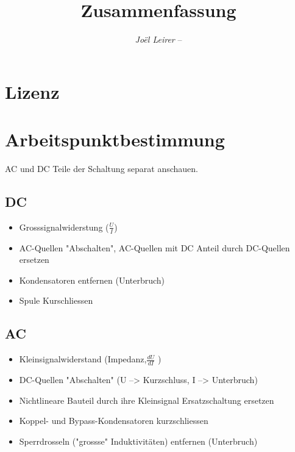 \documentclass[margin=normal]{tex/hsrzf}
\author{\textsl{Joël Leirer} -- \texttt{\theauthoremail}}
\title{\texttt{\themodule} Zusammenfassung}
\date{\thesemester}
\begin{document}

\maketitle



\section*{Lizenz}
\doclicenseThis

\clearpage
\tableofcontents

\clearpage
\setcounter{page}{1}

\section{Arbeitspunktbestimmung}
AC und DC Teile der Schaltung separat anschauen.
\subsection{DC}
\begin{itemize}
  \item Grosssignalwiderstung ($\frac{U}{I}$) 
  \item AC-Quellen "Abschalten", AC-Quellen mit DC Anteil durch DC-Quellen ersetzen
  \item Kondensatoren entfernen (Unterbruch)
  \item Spule Kurschliessen
\end{itemize}
\subsection{AC}
\begin{itemize}
  \item Kleinsignalwiderstand (Impedanz,$\frac{dU}{dI}$ )
  \item DC-Quellen "Abschalten" (U --> Kurzschluss, I --> Unterbruch)
  \item Nichtlineare Bauteil durch ihre Kleinsignal Ersatzschaltung ersetzen
  \item Koppel- und Bypass-Kondensatoren kurzschliessen
  \item Sperrdrosseln ("grossse" Induktivitäten) entfernen (Unterbruch)
\end{itemize}
\end{document}
